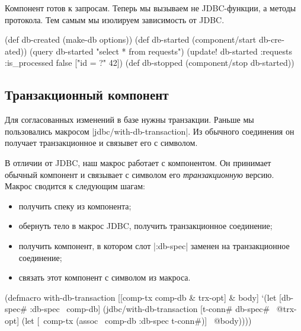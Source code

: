Компонент готов к запросам. Теперь мы вызываем не JDBC-функции, а методы
протокола. Тем самым мы изолируем зависимость от JDBC.

\begin{english}
  \begin{clojure}
(def db-created (make-db options))
(def db-started (component/start db-created))
(query db-started "select * from requests")
(update! db-started :requests {:is_processed false} ["id = ?" 42])
(def db-stopped (component/stop db-started))
  \end{clojure}
\end{english}

\subsection{Транзакционный компонент}

Для согласованных изменений в базе нужны транзакции. Раньше мы пользовались
макросом \spverb|jdbc/with-db-transaction|. Из обычного соединения он получает
транзакционное и связывет его с символом.

В отличии от JDBC, наш макрос работает с компонентом. Он принимает обычный
компонент и связывает с символом его \emph{транзакционную} версию. Макрос
сводится к следующим шагам:

\begin{itemize}

\item
  получить спеку из компонента;

\item
  обернуть тело в макрос JDBC, получить транзакционное соединение;

\item
  получить компонент, в котором слот \spverb|:db-spec| заменен на
  транзакционное соединение;

\item
  связать этот компонент с символом из макроса.

\end{itemize}

\begin{english}
  \begin{clojure}
(defmacro with-db-transaction
  [[comp-tx comp-db & trx-opt] & body]
  `(let [{db-spec# :db-spec} ~comp-db]
     (jdbc/with-db-transaction
       [t-conn# db-spec# ~@trx-opt]
       (let [~comp-tx (assoc ~comp-db :db-spec t-conn#)]
         ~@body))))
  \end{clojure}
\end{english}

